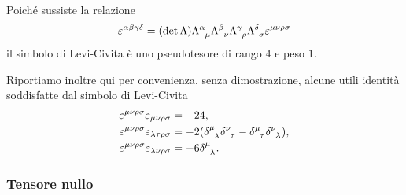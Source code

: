 Poiché sussiste la relazione
\begin{equation}
  \epsilon^{\alpha\beta\gamma\delta} = (\det\Lambda)
  \tensor{\Lambda}{^{\alpha}_{\mu}} \tensor{\Lambda}{^{\beta}_{\nu}}
  \tensor{\Lambda}{^{\gamma}_{\rho}} \tensor{\Lambda}{^{\delta}_{\sigma}}
  \epsilon^{\mu\nu\rho\sigma}
\end{equation}
il simbolo di Levi-Civita è uno pseudotesore di rango $4$ e peso $1$.

Riportiamo inoltre qui per convenienza, senza dimostrazione, alcune utili
identità soddisfatte dal simbolo di Levi-Civita
\begin{subequations}
  \begin{align}
    \epsilon^{\mu\nu\rho\sigma}\epsilon_{\mu\nu\rho\sigma} &= -24, \\
    \epsilon^{\mu\nu\rho\sigma}\epsilon_{\lambda\tau\rho\sigma} &=
    -2(\tensor{\delta}{^{\mu}_{\lambda}} \tensor{\delta}{^{\nu}_{\tau}} -
    \tensor{\delta}{^{\mu}_{\tau}} \tensor{\delta}{^{\nu}_{\lambda}}), \\
    \epsilon^{\mu\nu\rho\sigma}\epsilon_{\lambda\nu\rho\sigma} &= -6
    \tensor{\delta}{^{\mu}_{\lambda}}.
  \end{align}
\end{subequations}

\subsubsection{Tensore nullo}
\label{sec:tensore-nullo}

